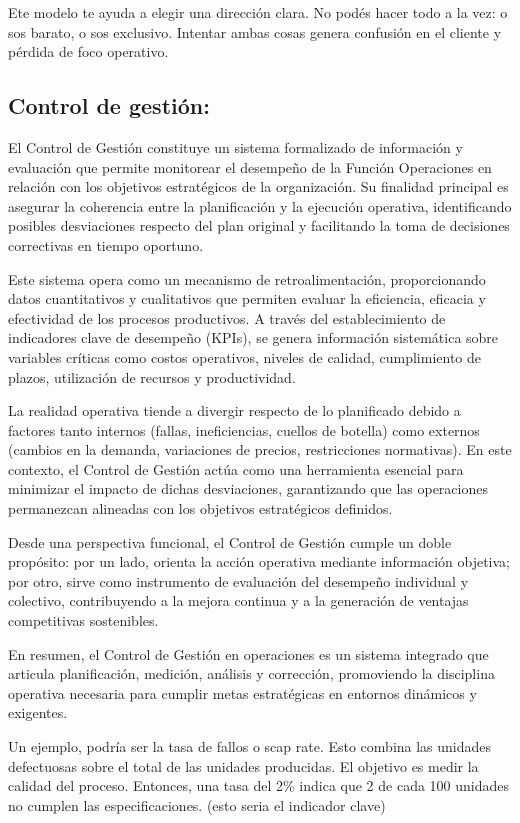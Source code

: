 \documentclass[a4paper,oneside,11pt]{article}
\begin{document}
Ete modelo te ayuda a elegir una dirección clara. No podés hacer todo a la vez: o sos barato, o sos exclusivo. Intentar ambas cosas genera confusión en el cliente y pérdida de foco operativo.

\subsection{Control de gestión:}

El Control de Gestión constituye un sistema formalizado de información y evaluación que permite monitorear el desempeño de la Función Operaciones en relación con los objetivos estratégicos de la organización. Su finalidad principal es asegurar la coherencia entre la planificación y la ejecución operativa, identificando posibles desviaciones respecto del plan original y facilitando la toma de decisiones correctivas en tiempo oportuno.

Este sistema opera como un mecanismo de retroalimentación, proporcionando datos cuantitativos y cualitativos que permiten evaluar la eficiencia, eficacia y efectividad de los procesos productivos. A través del establecimiento de indicadores clave de desempeño (KPIs), se genera información sistemática sobre variables críticas como costos operativos, niveles de calidad, cumplimiento de plazos, utilización de recursos y productividad.

La realidad operativa tiende a divergir respecto de lo planificado debido a factores tanto internos (fallas, ineficiencias, cuellos de botella) como externos (cambios en la demanda, variaciones de precios, restricciones normativas). En este contexto, el Control de Gestión actúa como una herramienta esencial para minimizar el impacto de dichas desviaciones, garantizando que las operaciones permanezcan alineadas con los objetivos estratégicos definidos.

Desde una perspectiva funcional, el Control de Gestión cumple un doble propósito: por un lado, orienta la acción operativa mediante información objetiva; por otro, sirve como instrumento de evaluación del desempeño individual y colectivo, contribuyendo a la mejora continua y a la generación de ventajas competitivas sostenibles.

En resumen, el Control de Gestión en operaciones es un sistema integrado que articula planificación, medición, análisis y corrección, promoviendo la disciplina operativa necesaria para cumplir metas estratégicas en entornos dinámicos y exigentes.

Un ejemplo, podría ser la tasa de fallos o scap rate. Esto combina las unidades defectuosas sobre el total de las unidades producidas. El objetivo es medir la calidad del proceso. Entonces, una tasa del 2\% indica que 2 de cada 100 unidades no cumplen las especificaciones. (esto seria el indicador clave)
\end{document}
